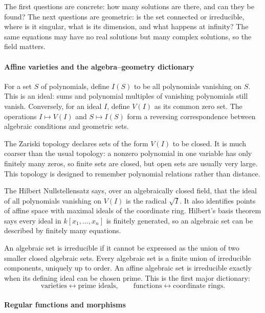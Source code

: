 The first questions are concrete: how many solutions are there, and can they be found? The next questions are geometric: is the set connected or irreducible, where is it singular, what is its dimension, and what happens at infinity? The same equations may have no real solutions but many complex solutions, so the field matters.

\paragraph{Affine varieties and the algebra--geometry dictionary}

For a set $S$ of polynomials, define $I(S)$ to be all polynomials vanishing on $S$. This is an ideal: sums and polynomial multiples of vanishing polynomials still vanish. Conversely, for an ideal $I$, define $V(I)$ as its common zero set. The operations $I\mapsto V(I)$ and $S\mapsto I(S)$ form a reversing correspondence between algebraic conditions and geometric sets.

The Zariski topology declares sets of the form $V(I)$ to be closed. It is much coarser than the usual topology: a nonzero polynomial in one variable has only finitely many zeros, so finite sets are closed, but open sets are usually very large. This topology is designed to remember polynomial relations rather than distance.

The Hilbert Nullstellensatz says, over an algebraically closed field, that the ideal of all polynomials vanishing on $V(I)$ is the radical $\sqrt I$. It also identifies points of affine space with maximal ideals of the coordinate ring. Hilbert's basis theorem says every ideal in $k[x_1,\ldots,x_n]$ is finitely generated, so an algebraic set can be described by finitely many equations.

An algebraic set is irreducible if it cannot be expressed as the union of two smaller closed algebraic sets. Every algebraic set is a finite union of irreducible components, uniquely up to order. An affine algebraic set is irreducible exactly when its defining ideal can be chosen prime. This is the first major dictionary:
\[
\text{varieties}\leftrightarrow\text{prime ideals},\qquad
\text{functions}\leftrightarrow\text{coordinate rings}.
\]
\cite{algebraic_geometry_ref1,algebraic_geometry_ref2}

\paragraph{Regular functions and morphisms}

